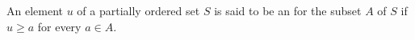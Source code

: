 An element $u$ of a partially ordered set $S$ is said to be an  for the subset $A$ of $S$ if $u \geq a$ for every $a \in A$.
